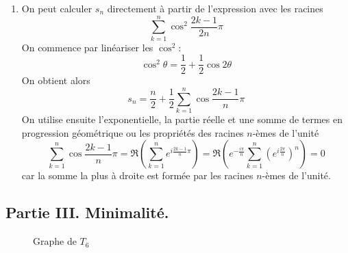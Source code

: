 \begin{enumerate}
\item On peut calculer $s_n$ directement à partir de l'expression avec les racines
\begin{displaymath}
 \sum_{k=1}^n \cos^2\frac{2k-1}{2n}\pi
\end{displaymath}
On commence par linéariser les $\cos^2$:
\begin{displaymath}
 \cos^2\theta = \frac{1}{2}+\frac{1}{2}\cos 2\theta
\end{displaymath}
On obtient alors
\begin{displaymath}
 s_n = \frac{n}{2} + \frac{1}{2}\sum_{k=1}^n \cos \frac{2k-1}{n}\pi
\end{displaymath}
On utilise ensuite l'exponentielle, la partie réelle et une somme de termes en progression géométrique ou les propriétés des racines $n$-èmes de l'unité
\begin{displaymath}
 \sum_{k=1}^n \cos \frac{2k-1}{n}\pi =
\Re\left( \sum_{k=1}^n e^{i \frac{2k-1}{n}\pi}\right)
=\Re\left(e^{-\frac{i\pi}{n}} \sum_{k=1}^n \left( e^{i \frac{2\pi}{n}}\right)^n \right)=0 
\end{displaymath}
car la somme la plus à droite est formée par les racines $n$-èmes de l'unité.
\end{enumerate}

\subsection*{Partie III. Minimalité.}
\begin{figure}[ht]
 \centering
 
 \caption{Graphe de $T_6$}
 \label{fig:Cthceb3_1}
\end{figure}

